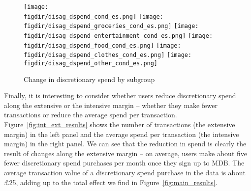 \begin{figure}[h]
    \centering
    \caption{Change in discretionary spend by subgroup}%
    \label{fig:disagg_groups}
    \texttt{[image: \\figdir/disag\_dspend\_cond\_es.png]}
    \texttt{[image: \\figdir/disag\_dspend\_groceries\_cond\_es.png]}
    \texttt{[image: \\figdir/disag\_dspend\_entertainment\_cond\_es.png]}
    \texttt{[image: \\figdir/disag\_dspend\_food\_cond\_es.png]}
    \texttt{[image: \\figdir/disag\_dspend\_clothes\_cond\_es.png]}
    \texttt{[image: \\figdir/disag\_dspend\_other\_cond\_es.png]}
\end{figure}


Finally, it is interesting to consider whether users reduce discretionary spend
along the extensive or the intensive margin -- whether they make fewer
transactions or reduce the average spend per transaction.
Figure~\ref{fig:int_ext_results} shows the number of transactions (the
extensive margin) in the left panel and the average spend per transaction (the
intensive margin) in the right panel. We can see that the reduction in spend is
clearly the result of changes along the extensive margin -- on average, users
make about five fewer discretionary spend purchases per month once they sign up
to MDB. The average transaction value of a discretionary spend purchase in the
data is about \pounds25, adding up to the total effect we find in
Figure~\ref{fig:main_results}.


